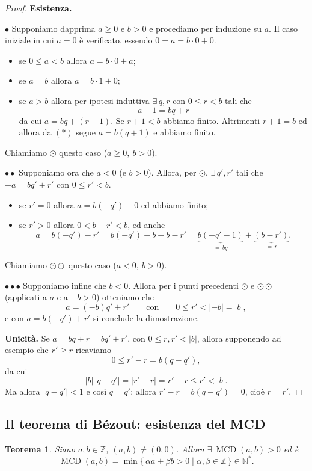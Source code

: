 \documentclass[11pt,a4paper]{article}
\newcommand{\N}{\mathbb{N}}
\newcommand{\Z}{\mathbb{Z}}
\theoremstyle{definition}
\theoremstyle{plain}
\newtheorem{teorema}[definizione]{Teorema}
\theoremstyle{remark}
\begin{document}
\begin{proof}
\textbf{Esistenza.}

$\bullet$ Supponiamo dapprima $a\ge0$ e $b>0$ e procediamo per induzione su $a$. Il caso iniziale in cui $a=0$ è verificato, essendo $0=a=b\cdot0+0$.
\begin{itemize}[nosep]
\item se $0\le a<b$ allora $a=b\cdot0+a$;
\item se $a=b$ allora $a=b\cdot1+0$;
\item se $a>b$ allora per ipotesi induttiva $\exists\,q,r$ con $0\le r<b$ tali che
\[
a-1=bq+r\tag{$*$}
\]
da cui $a=bq+(r+1)$. Se $r+1<b$ abbiamo finito. Altrimenti $r+1=b$ ed allora da $(*)$ segue $a=b(q+1)$ e abbiamo finito.
\end{itemize}
Chiamiamo $\odot$ questo caso ($a\ge0,\ b>0$).

$\bullet\bullet$ Supponiamo ora che $a<0$ (e $b>0$). Allora, per $\odot$, $\exists\,q',r'$ tali che $-a=bq'+r'$ con $0\le r'<b$.
\begin{itemize}[nosep]
\item se $r'=0$ allora $a=b(-q')+0$ ed abbiamo finito;
\item se $r'>0$ allora $0<b-r'<b$, ed anche
\[
a=b(-q')-r'=b(-q')-b+b-r'=\underbrace{b(-q'-1)}_{=\,bq}+\underbrace{(b-r')}_{=\,r}.
\]
\end{itemize}
Chiamiamo $\odot\!\odot$ questo caso ($a<0,\ b>0$).

$\bullet\bullet\bullet$ Supponiamo infine che $b<0$. Allora per i punti precedenti $\odot$ e $\odot\!\odot$ (applicati a $a$ e a $-b>0$) otteniamo che
\[
a=(-b)q'+r'\qquad\text{con}\qquad 0\le r'<|-b|=|b|,
\]
e con $a=b(-q')+r'$ si conclude la dimostrazione.

\medskip
\textbf{Unicità.} Se $a=bq+r=bq'+r'$, con $0\le r,r'<|b|$, allora supponendo ad esempio che $r'\ge r$ ricaviamo
\[
0\le r'-r=b(q-q'),
\]
da cui
\[
|b|\,|q-q'|=|r'-r|=r'-r\le r'<|b| .
\]
Ma allora $|q-q'|<1$ e così ${q=q'}$; allora $r'-r=b(q-q')=0$, cioè ${r=r'}$. \qedhere
\end{proof}

\subsection{Il teorema di Bézout: esistenza del MCD}

\begin{teorema}\label{thm:bezout}
Siano $a,b\in\Z$, $(a,b)\neq(0,0)$. Allora $\exists\ \operatorname{MCD}(a,b)>0$ ed è
\[
\operatorname{MCD}(a,b)=\min\{\,\alpha a+\beta b>0\mid\alpha,\beta\in\Z\,\}\in\N^* .
\]
\end{teorema}
\end{document}
